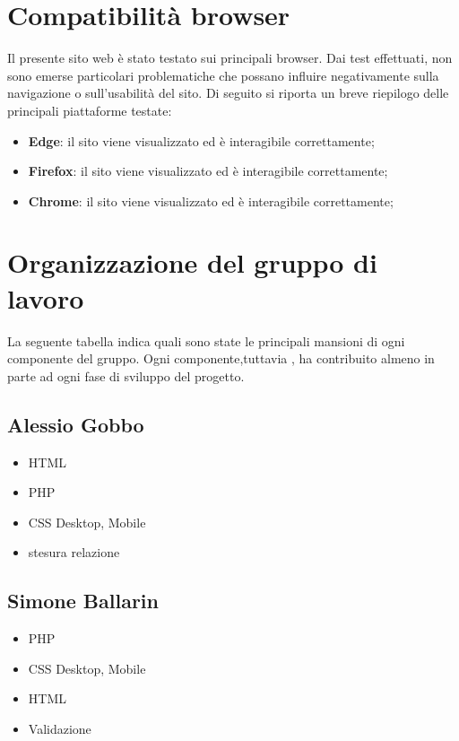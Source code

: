 \section{Compatibilità browser}

Il presente sito web è stato testato sui principali browser. Dai test effettuati, non sono emerse particolari problematiche che possano influire negativamente sulla navigazione o sull'usabilità del sito.
Di seguito si riporta un breve riepilogo delle principali piattaforme testate:
	\begin{itemize}
		\item \textbf{Edge}: il sito viene visualizzato ed è interagibile correttamente;
		\item \textbf{Firefox}: il sito viene visualizzato ed è interagibile correttamente;
		\item \textbf{Chrome}: il sito viene visualizzato ed è interagibile correttamente;
	\end{itemize}

\section{Organizzazione del gruppo di lavoro}

La seguente tabella indica quali sono state le principali mansioni di ogni componente del gruppo. Ogni componente,tuttavia , ha contribuito almeno in parte ad ogni fase di sviluppo del progetto.

\subsection{Alessio Gobbo}

\begin{itemize}
	\item HTML
	\item PHP 
	\item CSS Desktop, Mobile
	\item stesura relazione
\end{itemize}

\subsection{Simone Ballarin}

\begin{itemize}
	\item PHP 
	\item CSS Desktop, Mobile
	\item HTML
	\item Validazione
\end{itemize}

